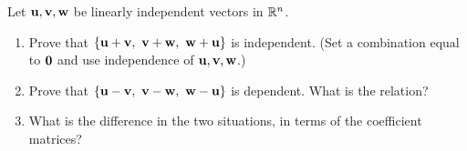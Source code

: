\documentclass[11pt]{article}
\begin{document}
Let $\mathbf{u},\mathbf{v},\mathbf{w}$ be linearly independent vectors in $\mathbb{R}^n$.
\begin{enumerate}
  \item Prove that $\{\bv{u}+\bv{v},\ \bv{v}+\bv{w},\ \bv{w}+\bv{u}\}$ is independent. (Set a combination equal to $\mathbf{0}$ and use independence of $\mathbf{u},\mathbf{v},\mathbf{w}$.)
  \item Prove that $\{\bv{u}-\bv{v},\ \bv{v}-\bv{w},\ \bv{w}-\bv{u}\}$ is dependent. What is the relation?
  \item What is the difference in the two situations, in terms of the coefficient matrices?
\end{enumerate}
\end{document}
